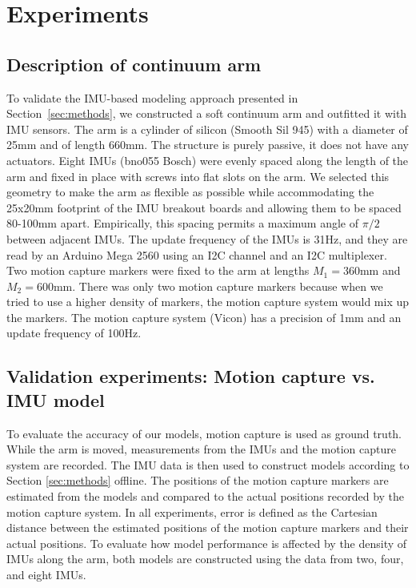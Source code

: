\section{Experiments}   \label{sec:experiments}

\subsection{Description of continuum arm}

To validate the IMU-based modeling approach presented in Section~\ref{sec:methods}, we constructed a soft continuum arm and outfitted it with IMU sensors.
The arm is a cylinder of silicon (Smooth Sil 945) with a diameter of 25mm and of length 660mm. 
The structure is purely passive, it does not have any actuators.
Eight IMUs (bno055 Bosch) were evenly spaced along the length of the arm and fixed in place with screws into flat slots on the arm.
We selected this geometry to make the arm as flexible as possible while accommodating the 25x20mm footprint of the IMU breakout boards and allowing them to be spaced 80-100mm apart. Empirically, this spacing permits a maximum angle of $\pi/2$ between adjacent IMUs.
The update frequency of the IMUs is 31Hz, and they are read by an Arduino Mega 2560 using an I2C channel and an I2C multiplexer.
Two motion capture markers were fixed to the arm at lengths $M_1=360$mm and $M_2=600$mm.
There was only two motion capture markers because when we tried to use a higher density of markers, the motion capture system would mix up the markers.
The motion capture system (Vicon) has a precision of 1mm and an update frequency of 100Hz.

\subsection{Validation experiments: Motion capture vs. IMU model}
To evaluate the accuracy of our models, motion capture is used as ground truth.
While the arm is moved, measurements from the IMUs and the motion capture system are recorded. The IMU data is then used to construct models according to Section \ref{sec:methods} offline.
The positions of the motion capture markers are estimated from the models and compared to the actual positions recorded by the motion capture system.
In all experiments, error is defined as the Cartesian distance between the estimated positions of the motion capture markers and their actual positions.
To evaluate how model performance is affected by the density of IMUs along the arm, both models are constructed using the data from two, four, and eight IMUs.


